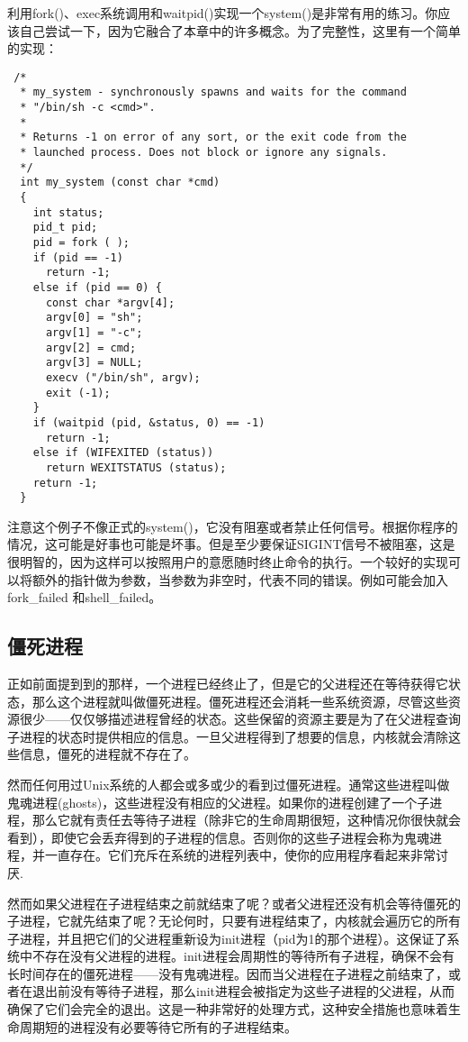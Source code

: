 利用fork()、exec系统调用和waitpid()实现一个system()是非常有用的练习。你应该自己尝试一下，因为它融合了本章中的许多概念。为了完整性，这里有一个简单的实现：

\begin{lstlisting}
 /*
  * my_system - synchronously spawns and waits for the command
  * "/bin/sh -c <cmd>".
  *
  * Returns -1 on error of any sort, or the exit code from the
  * launched process. Does not block or ignore any signals.
  */
  int my_system (const char *cmd)
  {
    int status;
    pid_t pid;
    pid = fork ( );
    if (pid == -1)
      return -1;
    else if (pid == 0) {
      const char *argv[4];
      argv[0] = "sh";
      argv[1] = "-c";
      argv[2] = cmd;
      argv[3] = NULL;
      execv ("/bin/sh", argv);
      exit (-1);
    }
    if (waitpid (pid, &status, 0) == -1)
      return -1;
    else if (WIFEXITED (status))
      return WEXITSTATUS (status);
    return -1;
  }
\end{lstlisting}

注意这个例子不像正式的system()，它没有阻塞或者禁止任何信号。根据你程序的情况，这可能是好事也可能是坏事。但是至少要保证SIGINT信号不被阻塞，这是很明智的，因为这样可以按照用户的意愿随时终止命令的执行。一个较好的实现可以将额外的指针做为参数，当参数为非空时，代表不同的错误。例如可能会加入fork\_failed 和shell\_failed。

\subsection{僵死进程}

正如前面提到到的那样，一个进程已经终止了，但是它的父进程还在等待获得它状态，那么这个进程就叫做僵死进程。僵死进程还会消耗一些系统资源，尽管这些资源很少——仅仅够描述进程曾经的状态。这些保留的资源主要是为了在父进程查询子进程的状态时提供相应的信息。一旦父进程得到了想要的信息，内核就会清除这些信息，僵死的进程就不存在了。

然而任何用过Unix系统的人都会或多或少的看到过僵死进程。通常这些进程叫做鬼魂进程(ghosts)，这些进程没有相应的父进程。如果你的进程创建了一个子进程，那么它就有责任去等待子进程（除非它的生命周期很短，这种情况你很快就会看到），即使它会丢弃得到的子进程的信息。否则你的这些子进程会称为鬼魂进程，并一直存在。它们充斥在系统的进程列表中，使你的应用程序看起来非常讨厌.

然而如果父进程在子进程结束之前就结束了呢？或者父进程还没有机会等待僵死的子进程，它就先结束了呢？无论何时，只要有进程结束了，内核就会遍历它的所有子进程，并且把它们的父进程重新设为init进程（pid为1的那个进程）。这保证了系统中不存在没有父进程的进程。init进程会周期性的等待所有子进程，确保不会有长时间存在的僵死进程——没有鬼魂进程。因而当父进程在子进程之前结束了，或者在退出前没有等待子进程，那么init进程会被指定为这些子进程的父进程，从而确保了它们会完全的退出。这是一种非常好的处理方式，这种安全措施也意味着生命周期短的进程没有必要等待它所有的子进程结束。

